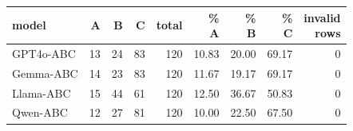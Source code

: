 \begin{tabular}{lrrrrrrrr}
\toprule
model & A & B & C & total & \makecell{\%\\A} & \makecell{\%\\B} & \makecell{\%\\C} & \makecell{invalid\\rows} \\
\midrule
GPT4o-ABC & 13 & 24 & 83 & 120 & 10.83 & 20.00 & 69.17 & 0 \\
Gemma-ABC & 14 & 23 & 83 & 120 & 11.67 & 19.17 & 69.17 & 0 \\
Llama-ABC & 15 & 44 & 61 & 120 & 12.50 & 36.67 & 50.83 & 0 \\
Qwen-ABC & 12 & 27 & 81 & 120 & 10.00 & 22.50 & 67.50 & 0 \\
\bottomrule
\end{tabular}
